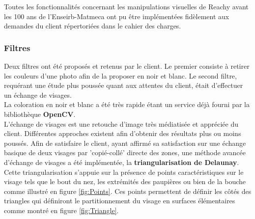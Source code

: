 \documentclass[a4paper,french]{article}
\begin{document}
Toutes les fonctionnalités concernant les manipulations visuelles de Reachy avant les 100 ans de l'Enseirb-Matmeca ont pu être implémentées fidèlement aux demandes du client répertoriées dans le cahier des charges.

\subsubsection{Filtres}
Deux filtres ont été proposés et retenus par le client. Le premier consiste à retirer les couleurs d'une photo afin de la proposer en noir et blanc. Le second filtre, requérant une étude plus poussée quant aux attentes du client, était d'effectuer un échange de visages.\\

La coloration en noir et blanc a été très rapide étant un service déjà fourni par la bibliothèque \textbf{OpenCV}.\\

L'échange de visages est une retouche d'image très médiatisée et appréciée du client. Différentes approches existent afin d'obtenir des résultats plus ou moins poussés. Afin de satisfaire le client, ayant affirmé sa satisfaction sur une échange basique de deux visages par 'copié-collé' directe des zones, une méthode avancée d'échange de visages a été implémentée, la \textbf{triangularisation de Delaunay}.\\
Cette triangularisation s'appuie sur la présence de points caractéristiques sur le visage tels que le bout du nez, les extrémités des paupières ou bien de la bouche comme illustré en figure \ref{fig:Points}. Ces points permettent de définir les côtés des triangles qui définiront le partitionnement du visage en surfaces élémentaires comme montré en figure \ref{fig:Triangle}.
\end{document}
